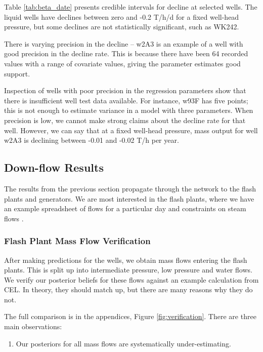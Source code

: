 \documentclass[a4paper, 12pt]{article}
\begin{document}


Table \ref{tab:beta_date} presents credible intervals for decline at selected wells. The liquid wells have declines between zero and -0.2 T/h/d for a fixed well-head pressure, but some declines are not statistically significant, such as WK242.

There is varying precision in the decline -- w2A3 is an example of a well with good precision in the decline rate. This is because there have been 64 recorded values with a range of covariate values, giving the parameter estimates good support.

Inspection of wells with poor precision in the regression parameters show that there is insufficient well test data available. For instance, w93F has five points; this is not enough to estimate variance in a model with three parameters. When precision is low, we cannot make strong claims about the decline rate for that well. However, we can say that at a fixed well-head pressure, mass output for well w2A3 is declining between -0.01 and -0.02 T/h per year.

\subsection{Down-flow Results}
The results from the previous section propagate through the network to the flash plants and generators. We are most interested in the flash plants, where we have an example spreadsheet of flows for a particular day and constraints on steam flows .

\subsubsection{Flash Plant Mass Flow Verification}

After making predictions for the wells, we obtain mass flows entering the flash plants. This is split up into intermediate pressure, low pressure and water flows. We verify our posterior beliefs for these flows against an example calculation from CEL. In theory, they should match up, but there are many reasons why they do not.

The full comparison is in the appendices, Figure \ref{fig:verification}. There are three main observations:

\begin{enumerate}
\item Our posteriors for all mass flows are systematically under-estimating.
\end{enumerate}
\end{document}
